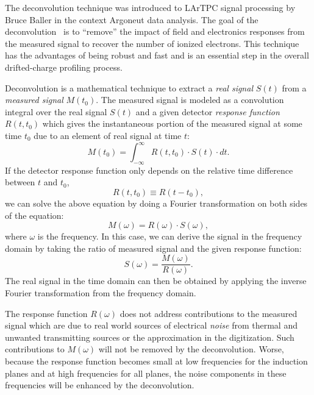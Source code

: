 The deconvolution technique was introduced to LArTPC signal processing by 
Bruce Baller in the context Argoneut data analysis. The goal of 
the deconvolution~\cite{Baller:2017ugz} is to ``remove'' the impact of field and electronics responses from the 
measured signal to recover the number of ionized electrons. This technique has 
the advantages of being robust and fast and is an essential step in the overall
drifted-charge profiling process. 

Deconvolution is a mathematical technique to extract a \textit{real signal}
$S(t)$ from a \textit{measured signal} $M(t_0)$.  The measured signal is
modeled as a convolution integral over the real signal $S(t)$ and a
given detector \textit{response function} $R(t,t_0)$ which gives the
instantaneous portion of the measured signal at some time $t_0$ due to
an element of real signal at time $t$:
\begin{equation}\label{eq:decon_1}
M(t_0) = \int_{-\infty}^{\infty}  R(t,t_0) \cdot S(t) \cdot dt.
\end{equation}
If the detector response function only depends on the relative time 
difference between $t$ and $t_0$,
\begin{equation}
R(t,t_0) \equiv R(t-t_0),
\end{equation}
 we can solve the above equation by 
doing a Fourier transformation on both sides of the equation:
\begin{equation}
M(\omega) = R(\omega) \cdot S(\omega), 
\end{equation}
where $\omega$ is the frequency. In this case, we can derive the signal in the 
frequency domain by taking the ratio of measured signal and the given
response function:
\begin{equation}\label{eq:decon_2}
S(\omega) = \frac{M(\omega)}{R(\omega)}.
\end{equation}
The real signal in the time domain can then be obtained by applying the inverse Fourier 
transformation from the frequency domain. 

The response function $R(\omega)$ does not address
contributions to the measured signal which are due to real world
sources of electrical \textit{noise} from thermal and unwanted transmitting
sources or the approximation in the digitization.
Such contributions to $M(\omega)$ will not be removed by the deconvolution.
Worse, because the response function becomes small at low 
frequencies for the induction planes and at high frequencies for all
planes, the noise components in these frequencies will be
enhanced by the deconvolution.

